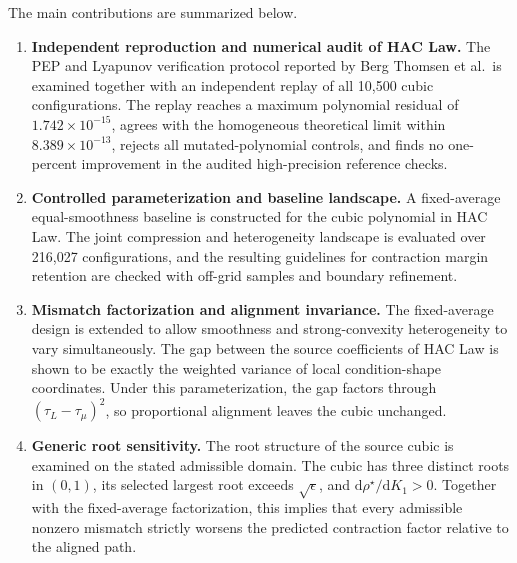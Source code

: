 The main contributions are summarized below.

\begin{enumerate}
\item \textbf{Independent reproduction and numerical audit of HAC Law.} The PEP and Lyapunov verification protocol reported by Berg Thomsen et al.\ is examined together with an independent replay of all 10,500 cubic configurations. The replay reaches a maximum polynomial residual of $1.742\times10^{-15}$, agrees with the homogeneous theoretical limit within $8.389\times10^{-13}$, rejects all mutated-polynomial controls, and finds no one-percent improvement in the audited high-precision reference checks.
\item \textbf{Controlled parameterization and baseline landscape.} A fixed-average equal-smoothness baseline is constructed for the cubic polynomial in HAC Law. The joint compression and heterogeneity landscape is evaluated over 216,027 configurations, and the resulting guidelines for contraction margin retention are checked with off-grid samples and boundary refinement.
\item \textbf{Mismatch factorization and alignment invariance.} The fixed-average design is extended to allow smoothness and strong-convexity heterogeneity to vary simultaneously. The gap between the source coefficients of HAC Law is shown to be exactly the weighted variance of local condition-shape coordinates. Under this parameterization, the gap factors through $(\tau_L-\tau_\mu)^2$, so proportional alignment leaves the cubic unchanged.
\item \textbf{Generic root sensitivity.} The root structure of the source cubic is examined on the stated admissible domain. The cubic has three distinct roots in $(0,1)$, its selected largest root exceeds $\sqrt{\epsilon}$, and $\mathrm{d}\rho^\star/\mathrm{d}K_1>0$. Together with the fixed-average factorization, this implies that every admissible nonzero mismatch strictly worsens the predicted contraction factor relative to the aligned path.
\end{enumerate}
